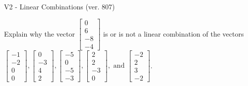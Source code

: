 \begin{exercise}
  \begin{exerciseTitle}V2 - Linear Combinations (ver. 807)\end{exerciseTitle}
  \begin{exerciseStatement}
    Explain why the vector \(\left[\begin{array}{c}
0 \\
6 \\
-8 \\
-4
\end{array}\right]\)  is or is not a linear 
	combination of the vectors \(\left[\begin{array}{c}
-1 \\
-2 \\
0 \\
0
\end{array}\right] , \left[\begin{array}{c}
0 \\
-3 \\
4 \\
2
\end{array}\right] , \left[\begin{array}{c}
-5 \\
0 \\
-5 \\
-3
\end{array}\right] , \left[\begin{array}{c}
2 \\
2 \\
-3 \\
0
\end{array}\right] , \text{ and } \left[\begin{array}{c}
-2 \\
2 \\
3 \\
-2
\end{array}\right]\).
	



\end{exerciseStatement}
\end{exercise}
